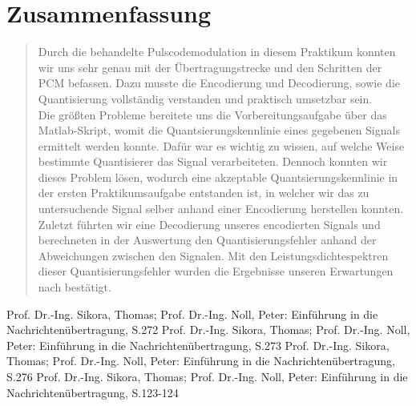     
\section{Zusammenfassung}
\begin{quote}

    Durch die behandelte Pulscodemodulation in diesem Praktikum konnten wir uns
    sehr genau mit der Übertragungstrecke und den Schritten der PCM befassen.
    Dazu musste die Encodierung und Decodierung, sowie die Quantisierung
    vollständig verstanden und praktisch umsetzbar sein.\\
    
    Die größten Probleme bereitete uns die Vorbereitungsaufgabe über das
    Matlab-Skript, womit die Quantsierungskennlinie eines gegebenen Signals
    ermittelt werden konnte. Dafür war es wichtig zu wissen, auf welche Weise
    bestimmte Quantisierer das Signal verarbeiteten. Dennoch konnten wir dieses
    Problem lösen, wodurch eine akzeptable Quantsierungskennlinie in der ersten
    Praktikumsaufgabe entstanden ist, in welcher wir das zu untersuchende Signal
    selber anhand einer Encodierung herstellen konnten.\\
     
    Zuletzt führten wir eine Decodierung unseres encodierten Signals und
    berechneten in der Auswertung den Quantisierungsfehler anhand der
    Abweichungen zwischen den Signalen. Mit den Leistungsdichtespektren dieser
    Quantisierungsfehler wurden die Ergebnisse unseren Erwartungen nach
    bestätigt.
    
\end{quote}%
         



\begin{thebibliography}{999}
  Prof. Dr.-Ing. Sikora, Thomas; Prof. Dr.-Ing. Noll, Peter: Einführung in die
 Nachrichtenübertragung, S.272
 Prof. Dr.-Ing. Sikora, Thomas; Prof. Dr.-Ing. Noll, Peter: Einführung in die
 Nachrichtenübertragung, S.273
 Prof. Dr.-Ing. Sikora, Thomas; Prof. Dr.-Ing. Noll, Peter: Einführung in die
 Nachrichtenübertragung, S.276
  Prof. Dr.-Ing. Sikora, Thomas; Prof. Dr.-Ing. Noll, Peter: Einführung in die
 Nachrichtenübertragung, S.123-124



\end{thebibliography}


  	    
